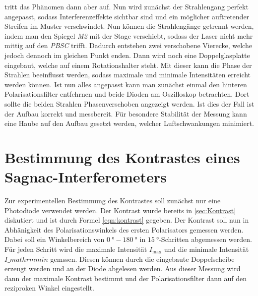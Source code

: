 tritt das Phänomen dann aber auf. Nun wird zunächst der Strahlengang perfekt angepasst, sodass Interferenzeffekte sichtbar sind und ein möglicher auftretender Streifen im Muster
verschwindet. Nun können die Strahlengänge getrennt werden, indem man den Spiegel \textit{M2} mit der Stage verschiebt, sodass der Laser nicht mehr mittig auf den \textit{PBSC} trifft.
Dadurch entstehen zwei verschobene Vierecke, welche jedoch dennoch im gleichen Punkt enden. Dann wird noch eine Doppelglasplatte eingebaut, welche auf einem Rotationshalter steht. Mit 
dieser kann die Phase der Strahlen beeinflusst werden, sodass maximale und minimale Intensitäten erreicht werden können. Ist nun alles angepasst kann man zunächst einmal den hinteren 
Polarisationsfilter entfehrnen und beide Dioden am Oszilloskop betrachten. Dort sollte die beiden Strahlen Phasenverschoben angezeigt werden. Ist dies der Fall ist der Aufbau korrekt
und messbereit. Für besondere Stabilität der Messung kann eine Haube auf den Aufbau gesetzt werden, welcher Luftschwankungen minimiert.

\section{Bestimmung des Kontrastes eines Sagnac-Interferometers}
\label{sec:kontrast}
Zur experimentellen Bestimmung des Kontrastes soll zunächst nur eine Photodiode verwendet werden. Der Kontrast wurde bereits in \autoref{sec:Kontrast} diskutiert und ist durch Formel \ref{eqn:kontrast}
gegeben. Der Kontrast soll nun in Abhänigkeit des Polarisationswinkels des ersten Polarisators gemessen werden. Dabei soll ein Winkelbereich von $\qty{0}{\degree}-\qty{180}{\degree}$ in 
$\qty{15}{\degree}$-Schritten abgemessen werden. Für jeden Schritt wird die maximale Intensität $I_\mathrm{max}$ und die minimale Intensität $I\_mathrm{min}$ gemssen. Diesen können durch 
die eingebaute Doppelscheibe erzeugt werden und an der Diode abgelesen werden. Aus dieser Messung wird dann der maximale Kontrast bestimmt und der Polarisationsfilter dann auf den 
reziproken Winkel eingestellt.


